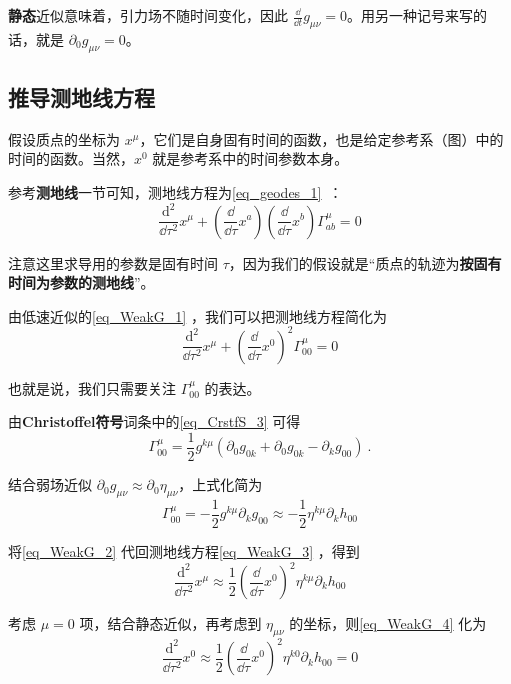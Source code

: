 \textbf{静态}近似意味着，引力场不随时间变化，因此 $\frac{\dd}{\dd t}g_{\mu\nu}=0$。用另一种记号来写的话，就是 $\partial_0g_{\mu\nu}=0$。

\subsection{推导测地线方程}

假设质点的坐标为 $x^\mu$，它们是自身固有时间的函数，也是给定参考系（图）中的时间的函数。当然，$x^0$ 就是参考系中的时间参数本身。

参考\textbf{测地线}一节可知，测地线方程为\autoref{eq_geodes_1}~：
\begin{equation}
\frac{\mathrm{d}^2}{\dd\tau^2}x^\mu+(\frac{\dd}{\dd\tau}x^a)(\frac{\dd}{\dd\tau}x^b)\Gamma^\mu_{ab}=0
\end{equation}

注意这里求导用的参数是固有时间 $\tau$，因为我们的假设就是“质点的轨迹为\textbf{按固有时间为参数的测地线}”。

由低速近似的\autoref{eq_WeakG_1} ，我们可以把测地线方程简化为
\begin{equation}\label{eq_WeakG_3}
\frac{\mathrm{d}^2}{\dd\tau^2}x^\mu+(\frac{\dd}{\dd\tau}x^0)^2\Gamma^\mu_{00}=0
\end{equation}

也就是说，我们只需要关注 $\Gamma^\mu_{00}$ 的表达。

由\textbf{Christoffel符号}词条中的\autoref{eq_CrstfS_3} 可得
\begin{equation}
\Gamma^\mu_{00}=\frac{1}{2}g^{k\mu}(\partial_0g_{0k}+\partial_0g_{0k}-\partial_{k}g_{00})~.
\end{equation}

结合弱场近似 $\partial_0g_{\mu\nu}\approx\partial_0\eta_{\mu\nu}$，上式化简为
\begin{equation}\label{eq_WeakG_2}
\Gamma^\mu_{00}=-\frac{1}{2}g^{k\mu}\partial_{k}g_{00}\approx-\frac{1}{2}\eta^{k\mu}\partial_{k}h_{00}
\end{equation}

将\autoref{eq_WeakG_2} 代回测地线方程\autoref{eq_WeakG_3} ，得到
\begin{equation}\label{eq_WeakG_4}
\frac{\mathrm{d}^2}{\dd\tau^2}x^\mu\approx\frac{1}{2}(\frac{\dd}{\dd\tau}x^0)^2\eta^{k\mu}\partial_{k}h_{00}
\end{equation}

考虑 $\mu=0$ 项，结合静态近似，再考虑到 $\eta_{\mu\nu}$ 的坐标，则\autoref{eq_WeakG_4} 化为
\begin{equation}
\frac{\mathrm{d}^2}{\dd\tau^2}x^0\approx\frac{1}{2}(\frac{\dd}{\dd\tau}x^0)^2\eta^{k0}\partial_{k}h_{00}=0
\end{equation}

